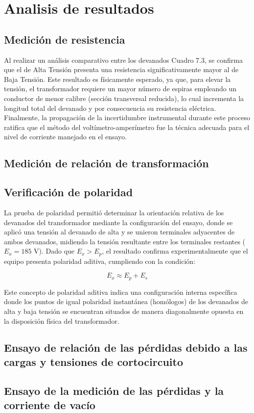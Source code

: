 \section{Analisis de resultados}

\subsection{Medición de resistencia}

Al realizar un análisis comparativo entre los devanados Cuadro 7.3, se confirma que el de Alta Tensión presenta una resistencia significativamente mayor al de Baja Tensión. Este resultado es físicamente esperado, ya que, para elevar la tensión, el transformador requiere un mayor número de espiras empleando un conductor de menor calibre (sección transversal reducida), lo cual incrementa la longitud total del devanado y por consecuencia su resistencia eléctrica. Finalmente, la propagación de la incertidumbre instrumental durante este proceso ratifica que el método del voltímetro-amperímetro fue la técnica adecuada para el nivel de corriente manejado en el ensayo.

\subsection{Medición de relación de transformación}


\subsection{Verificación de polaridad}

La prueba de polaridad permitió determinar la orientación relativa de los devanados del transformador mediante la configuración del ensayo, donde se aplicó una tensión al devanado de alta y se unieron terminales adyacentes de ambos devanados, midiendo la tensión resultante entre los terminales restantes ($E_x = 185 \text{ V}$). Dado que $E_x > E_p$, el resultado confirma experimentalmente que el equipo presenta polaridad aditiva, cumpliendo con la condición:

\begin{equation}
    E_x \approx E_p + E_s
\end{equation}

Este concepto de polaridad aditiva indica una configuración interna específica donde los puntos de igual polaridad instantánea (homólogos) de los devanados de alta y baja tensión se encuentran situados de manera diagonalmente opuesta en la disposición física del transformador.


\subsection{Ensayo de relación de las pérdidas debido a las cargas y tensiones de cortocircuito}
\subsection{Ensayo de la medición de las pérdidas y la corriente de vacío}

